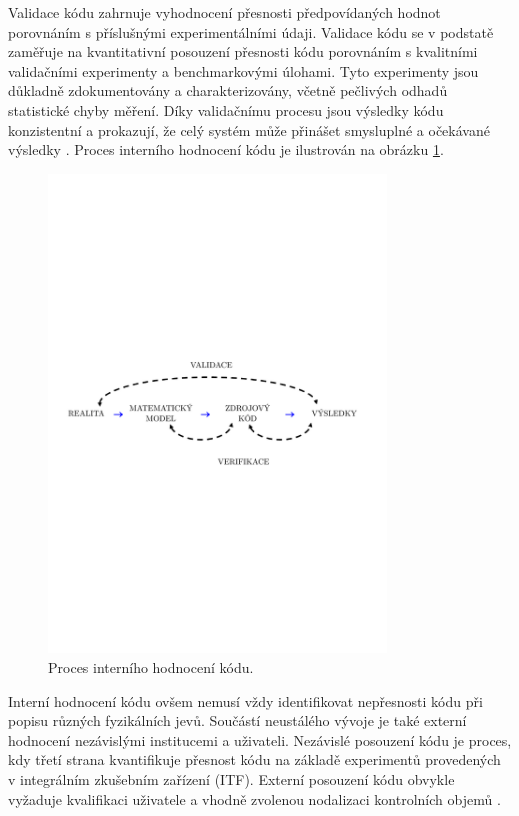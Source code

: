 Validace kódu zahrnuje vyhodnocení přesnosti předpovídaných hodnot porovnáním s příslušnými experimentálními údaji. Validace kódu se v podstatě zaměřuje na kvantitativní posouzení přesnosti kódu porovnáním s kvalitními validačními experimenty a benchmarkovými úlohami. Tyto experimenty jsou důkladně zdokumentovány a charakterizovány, včetně pečlivých odhadů statistické chyby měření. Díky validačnímu procesu jsou výsledky kódu konzistentní a prokazují, že celý systém může přinášet smysluplné a očekávané výsledky \cite{petruzzi2008thermal}. Proces interního hodnocení kódu je ilustrován na obrázku \ref{fig:v_v_sean_prezentace}.
\begin{figure}[H]
	\centering
	\includegraphics[width=0.8\textwidth, trim={0cm 10cm 0cm 10cm}, clip]{./02_teorie/obrazky/v_v_sean_lectures.pdf}
	\caption{Proces interního hodnocení kódu.}
	\label{fig:v_v_sean_prezentace}
\end{figure}

Interní hodnocení kódu ovšem nemusí vždy identifikovat nepřesnosti kódu při popisu různých fyzikálních jevů. Součástí neustálého vývoje je také externí hodnocení nezávislými institucemi a uživateli. Nezávislé posouzení kódu je proces, kdy třetí strana kvantifikuje přesnost kódu na základě experimentů provedených v integrálním zkušebním zařízení (ITF). Externí posouzení kódu obvykle vyžaduje kvalifikaci uživatele a vhodně zvolenou nodalizaci kontrolních objemů \cite{petruzzi2008thermal}. 

